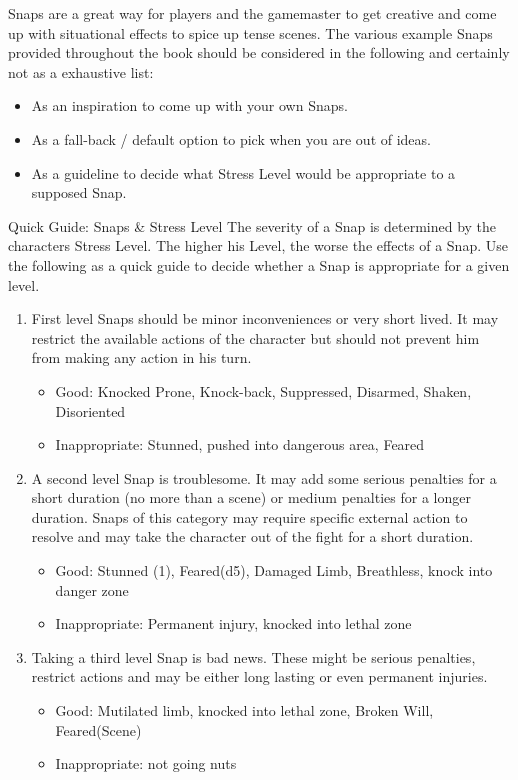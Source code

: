	Snaps are a great way for players and the gamemaster to get creative and come up with situational effects to spice up tense scenes.
	The various example Snaps provided throughout the book should be considered in the following and certainly not as a exhaustive list:
	\begin{itemize}
		\item As an inspiration to come up with your own Snaps.
		\item As a fall-back / default option to pick when you are out of ideas.
		\item As a guideline to decide what Stress Level would be appropriate to a supposed Snap.
	\end{itemize}

	\begin{DndSidebar}{Quick Guide: Snaps \& Stress Level}
	The severity of a Snap is determined by the characters Stress Level.
	The higher his Level, the worse the effects of a Snap.
	Use the following as a quick guide to decide whether a Snap is appropriate for a given level.
	\begin{enumerate}
		\item First level Snaps should be minor inconveniences or very short lived. It may restrict the available actions of the character but should not prevent him from making any action in his turn.
		\begin{itemize}
			\item Good: Knocked Prone, Knock-back, Suppressed, Disarmed, Shaken, Disoriented
			\item Inappropriate: Stunned, pushed into dangerous area, Feared
		\end{itemize}
		\item A second level Snap is troublesome. It may add some serious penalties for a short duration (no more than a scene) or medium penalties for a longer duration. Snaps of this category may require specific external action to resolve and may take the character out of the fight for a short duration.
		\begin{itemize}
			\item Good: Stunned (1), Feared(d5), Damaged Limb, Breathless, knock into danger zone
			\item Inappropriate: Permanent injury, knocked into lethal zone
		\end{itemize}
		\item Taking a third level Snap is bad news. These might be serious penalties, restrict actions and may be either long lasting or even permanent injuries.
		\begin{itemize}
			\item Good: Mutilated limb, knocked into lethal zone, Broken Will, Feared(Scene)
			\item Inappropriate: not going nuts
		\end{itemize}
	\end{enumerate}
	\end{DndSidebar}

